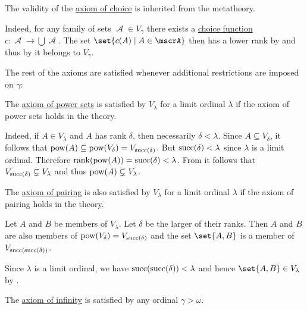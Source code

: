 \begin{remark}
\begin{thmenum}[series=thm:cumulative_hierarchy_model_of_zfc]
     The validity of the \hyperref[def:zfc/choice]{axiom of choice} is inherited from the metatheory.

    Indeed, for any family of sets \( \mscrA \in V_\gamma \) there exists a \hyperref[def:choice_function]{choice function} \( c: \mscrA \to \bigcup \mscrA \). The set \( \set{ c(A) \given A \in \mscrA } \) then has a lower rank by  and thus by  it belongs to \( V_\gamma \).
  \end{thmenum}

  The rest of the axioms are satisfied whenever additional restrictions are imposed on \( \gamma \):
  \begin{thmenum}[series=thm:cumulative_hierarchy_model_of_zfc]
     The \hyperref[def:zfc/power_set]{axiom of power sets} is satisfied by \( V_\lambda \) for a limit ordinal \( \lambda \) if the axiom of power sets holds in the theory.

    Indeed, if \( A \in V_\lambda \) and \( A \) has rank \( \delta \), then necessarily \( \delta < \lambda \). Since \( A \subseteq V_\delta \), it follows that \( \operatorname{pow}(A) \subseteq \operatorname{pow}(V_\delta) = V_{\operatorname{succ}(\delta)} \). But \( \operatorname{succ}(\delta) < \lambda \) since \( \lambda \) is a limit ordinal. Therefore \( \operatorname{rank}(\operatorname{pow}(A)) = \operatorname{succ}(\delta) < \lambda \). From  it follows that \( V_{\operatorname{succ}(\delta)} \subsetneq V_\lambda \) and thus \( \operatorname{pow}(A) \subsetneq V_\lambda \).

     The \hyperref[def:zfc/pairing]{axiom of pairing} is also satisfied by \( V_\lambda \) for a limit ordinal \( \lambda \) if the axiom of pairing holds in the theory.

    Let \( A \) and \( B \) be members of \( V_\lambda \). Let \( \delta \) be the larger of their ranks. Then \( A \) and \( B \) are also members of \( \operatorname{pow}(V_\delta) = V_{\operatorname{succ}(\delta)} \) and the set \( \set{ A, B } \) is a member of \( V_{\operatorname{succ}(\operatorname{succ}(\delta))} \).

    Since \( \lambda \) is a limit ordinal, we have \( \operatorname{succ}(\operatorname{succ}(\delta)) < \lambda \) and hence \( \set{ A, B } \in V_\lambda \) by .

     The \hyperref[def:zfc/infinity]{axiom of infinity} is satisfied by any ordinal \( \gamma > \omega \).


\end{thmenum}
\end{remark}
